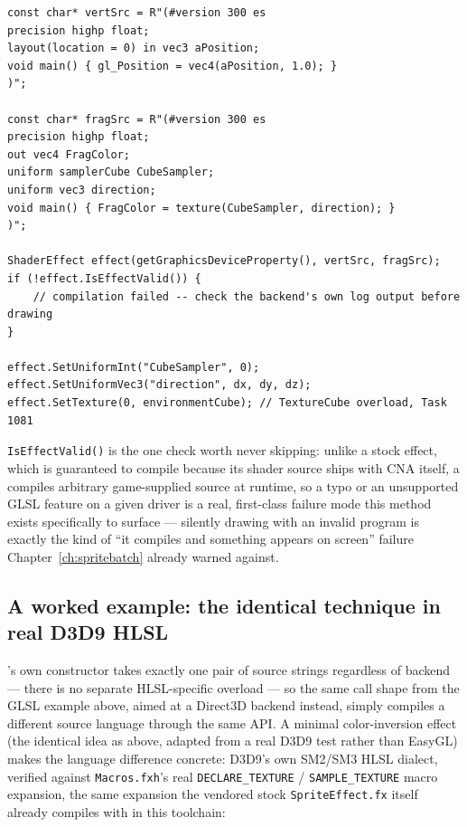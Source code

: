 \begin{lstlisting}
const char* vertSrc = R"(#version 300 es
precision highp float;
layout(location = 0) in vec3 aPosition;
void main() { gl_Position = vec4(aPosition, 1.0); }
)";

const char* fragSrc = R"(#version 300 es
precision highp float;
out vec4 FragColor;
uniform samplerCube CubeSampler;
uniform vec3 direction;
void main() { FragColor = texture(CubeSampler, direction); }
)";

ShaderEffect effect(getGraphicsDeviceProperty(), vertSrc, fragSrc);
if (!effect.IsEffectValid()) {
    // compilation failed -- check the backend's own log output before drawing
}

effect.SetUniformInt("CubeSampler", 0);
effect.SetUniformVec3("direction", dx, dy, dz);
effect.SetTexture(0, environmentCube); // TextureCube overload, Task 1081
\end{lstlisting}

\texttt{IsEffectValid()} is the one check worth never skipping: unlike a stock effect, which
is guaranteed to compile because its shader source ships with CNA itself, a
 compiles arbitrary game-supplied source at runtime, so a typo or an
unsupported GLSL feature on a given driver is a real, first-class failure mode this method
exists specifically to surface --- silently drawing with an invalid program is exactly the
kind of ``it compiles and something appears on screen'' failure Chapter~\ref{ch:spritebatch}
already warned against.

\subsection{A worked example: the identical technique in real D3D9 HLSL}

's own constructor takes exactly one pair of source strings regardless
of backend --- there is no separate HLSL-specific overload --- so the same call shape from the
GLSL example above, aimed at a Direct3D backend instead, simply compiles a different source
language through the same API. A minimal color-inversion effect (the identical idea as above,
adapted from a real D3D9 test rather than EasyGL) makes the language difference concrete:
D3D9's own SM2/SM3 HLSL dialect, verified against \texttt{Macros.fxh}'s real
\texttt{DECLARE\_TEXTURE} / \texttt{SAMPLE\_TEXTURE} macro expansion, the same expansion the
vendored stock \texttt{SpriteEffect.fx} itself already compiles with in this toolchain:

